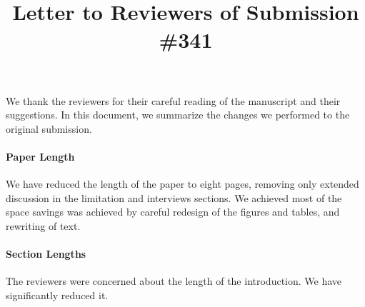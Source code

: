 \documentclass{article}
\title{Letter to Reviewers of Submission \#341}
\begin{document}
\maketitle

We thank the reviewers for their careful reading of the manuscript and
their suggestions. In this document, we summarize the changes we
performed to the original submission.

\paragraph*{Paper Length} We have reduced the length of the paper
to eight pages, removing only extended discussion in the limitation
and interviews sections. We achieved most of the space savings was
achieved by careful redesign of the figures and tables, and rewriting
of text.

\paragraph*{Section Lengths} The reviewers were concerned about the length
of the introduction. We have significantly reduced it.
\end{document}
